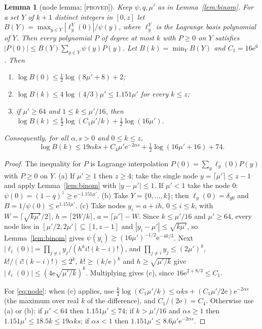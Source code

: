 \documentclass[10pt,reqno]{amsart}
\newtheorem{lemma}[theorem]{Lemma}
\theoremstyle{definition}
\theoremstyle{remark}
\newcommand{\e}{\mathrm e}
\newcommand{\lab}[1]{\textup{[\textsc{#1}]}}
\begin{document}
\begin{lemma}[node lemma; \lab{proved}]\label{lem:node}
Keep $\psi,q,\mu'$ as in Lemma~\ref{lem:binom}.  For a set $Y$ of $k+1$
distinct integers in $[0,z]$ let $B(Y)=\max_{y\in Y}|\ell^Y_y(0)|/\psi(y)$,
where $\ell^Y_y$ is the Lagrange basis polynomial of $Y$.  Then every
polynomial $P$ of degree at most $k$ with $P\geq0$ on $Y$ satisfies
$|P(0)|\leq B(Y)\sum_{y\in Y}\psi(y)P(y)$.  Let $B(k)=\min_YB(Y)$ and
$C_1=16\e^6$.  Then
\begin{enumerate}
\item[(a)] $\log B(0)\leq\frac12\log(8\mu'+8)+2$;
\item[(b)] $\log B(k)\leq4\log(4/3)\mu'\leq1.151\mu'$ for every $k\leq z$;
\item[(c)] if $\mu'\geq64$ and $1\leq k\leq\mu'/16$, then
  $\log B(k)\leq\frac k2\log(C_1\mu'/k)+\frac12\log(16\mu')$.
\end{enumerate}
Consequently, for all $\alpha,s>0$ and $0\leq k\leq z$,
\begin{equation}\label{eq:node}
 \log B(k)\leq19\alpha ks+C_4\mu'\e^{-2\alpha s}+\tfrac12\log(16\mu'+16)+74.
\end{equation}
\end{lemma}
\begin{proof}
The inequality for $P$ is Lagrange interpolation $P(0)=\sum_y\ell_y(0)P(y)$
with $P\geq0$ on $Y$.
(a) If $\mu'\geq1$ then $z\geq4$; take the single node
$y=\lceil\mu'\rceil\leq z-1$ and apply Lemma~\ref{lem:binom} with
$|y-\mu'|\leq1$.  If $\mu'<1$ take the node $0$:
$\psi(0)=(1-q)^z\geq\e^{-1.151\mu'}$.
(b) Take $Y=\{0,\dots,k\}$; then $\ell_y(0)=\delta_{y0}$ and
$B=1/\psi(0)\leq\e^{1.151\mu'}$.
(c) Take nodes $y_i=a+ih$, $0\leq i\leq k$, with
$W=\lceil\sqrt{k\mu'}/2\rceil$, $h=\lceil2W/k\rceil$, $a=\lceil\mu'\rceil-W$.
Since $k\leq\mu'/16$ and $\mu'\geq64$, every node lies in
$[\mu'/2,2\mu']\subseteq[1,z-1]$ and $|y_i-\mu'|\leq\sqrt{k\mu'}$, so
Lemma~\ref{lem:binom} gives $\psi(y_i)\geq(16\mu')^{-1/2}\e^{-4k/3}$.
Next $|\ell_i(0)|=\prod_{j\neq i}y_j/(h^ki!(k-i)!)$, and
$\prod_{j\neq i}y_j\leq(2\mu')^k$, $k!/(i!(k-i)!)\leq2^k$, $k!\geq(k/\e)^k$
and $h\geq\sqrt{\mu'/k}$ give $|\ell_i(0)|\leq(4\e\sqrt{\mu'/k})^k$.
Multiplying gives (c), since $16\e^{2+8/3}\leq C_1$.

For \eqref{eq:node}: when (c) applies, use
$\frac k2\log(C_1\mu'/k)\leq\alpha ks+(C_1\mu'/2\e)\e^{-2\alpha s}$ (the
maximum over real $k$ of the difference), and $C_1/(2\e)=C_4$.  Otherwise
use (a) or (b): if $\mu'<64$ then $1.151\mu'\leq74$; if $k>\mu'/16$ and
$\alpha s\geq1$ then $1.151\mu'\leq18.5k\leq19\alpha ks$; if $\alpha s<1$
then $1.151\mu'\leq8.6\mu'\e^{-2\alpha s}$.
\end{proof}
\end{document}
